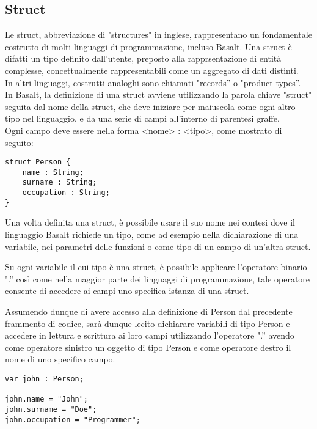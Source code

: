 \subsection{Struct}
Le struct, abbreviazione di "structures" in inglese, rappresentano un fondamentale costrutto di molti 
linguaggi di programmazione, incluso Basalt. Una struct è difatti un tipo definito dall’utente, preposto alla 
rapprsentazione di entità complesse, concettualmente rappresentabili come un aggregato di dati distinti. \\

In altri linguaggi, costrutti analoghi sono chiamati "records” o "product-types”. \\

In Basalt, la definizione di una struct avviene utilizzando la parola chiave "struct" seguita dal nome della struct, 
che deve iniziare per maiuscola come ogni altro tipo nel linguaggio, e da una serie di campi all'interno di parentesi graffe. \\

Ogni campo deve essere nella forma <nome> : <tipo>, come mostrato di seguito:

\vspace{0.5cm}
\begin{lstlisting}[frame=single]
struct Person {
    name : String;
    surname : String;
    occupation : String;
}
\end{lstlisting}
\vspace{0.5cm}


Una volta definita una struct, è possibile usare il suo nome nei contesi dove il linguaggio Basalt richiede un tipo, come ad esempio nella dichiarazione di una variabile, nei parametri delle funzioni o come tipo di un campo di un’altra struct. 

Su ogni variabile il cui tipo è una struct, è possibile applicare l’operatore binario ".” così come nella maggior parte dei linguaggi di programmazione, tale operatore consente di accedere ai campi uno specifica istanza di una struct. 

Assumendo dunque di avere accesso alla definizione di Person dal precedente frammento di codice, sarà dunque lecito dichiarare variabili di tipo Person e accedere in lettura e scrittura ai loro campi utilizzando l’operatore ".” avendo come operatore sinistro un oggetto di tipo Person e come operatore destro il nome di uno specifico campo.

\vspace{0.5cm}
\begin{lstlisting}[frame=single]
var john : Person;

john.name = "John";
john.surname = "Doe";
john.occupation = "Programmer";
\end{lstlisting}
\vspace{0.5cm}

\newpage
 \newpage
 \newpage